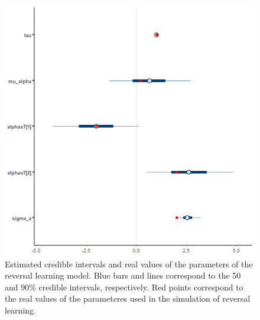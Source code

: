 \documentclass[
]{article}
\begin{document}
\begin{figure}

\includegraphics[width=6.67in,]{images/reversal_mcmc_interv} \hfill{}

\caption{Estimated credible intervals and real values of the parameters of the reversal learning model. Blue bars and lines correspond to the 50 and 90\% credible intervals, respectively. Red points correspond to the real values of the parameteres used in the simulation of reversal learning. }\label{fig:rev_sim_interv}
\end{figure}
\end{document}

